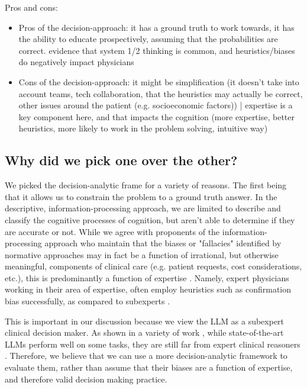 Pros and cons:
\begin{itemize}
    \item Pros of the decision-approach: it has a ground truth to work towards, it has the ability to educate prospectively, assuming that the probabilities are correct. evidence that system 1/2 thinking is common, and heuristics/biases do negatively impact physicians
    \item Cons of the decision-approach: it might be simplification (it doesn't take into account teams, tech collaboration, that the heuristics may actually be correct,  other issues around the patient (e.g. socioeconomic factors)) | expertise is a key component here, and that impacts the cognition (more expertise, better heuristics, more likely to work in the problem solving, intuitive way)
\end{itemize}

\subsection{Why did we pick one over the other?}
We picked the decision-analytic frame for a variety of reasons. The first being that it allows us to constrain the problem to a ground truth answer. In the descriptive, information-processing approach, we are limited to describe and classify the cognitive processes of cognition, but aren't able to determine if they are accurate or not. While we agree with proponents of the information-processing approach who maintain that the biases or "fallacies" identified by normative approaches may in fact be a function of irrational, but otherwise meaningful, components of clinical care (e.g. patient requests, cost considerations, etc.), this is predominantly a function of expertise \cite{patel1991general}. Namely, expert physicians working in their area of expertise, often employ heuristics such as confirmation bias successfully, as compared to subexperts \cite{patelEmergingParadigmsCognition2002a}.

This is important in our discussion because we view the LLM as a subexpert clinical decision maker. As shown in a variety of work \cite{}, while state-of-the-art LLMs perform well on some tasks, they are still far from expert clinical reasoners \cite{harrisLargeLanguageModels2023}. Therefore, we believe that we can use a more decision-analytic framework to evaluate them, rather than assume that their biases are a function of expertise, and therefore valid decision making practice.



